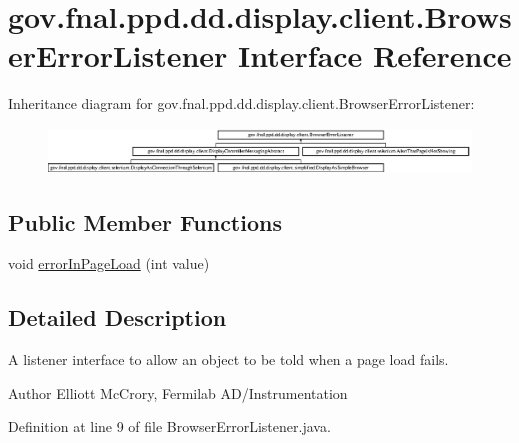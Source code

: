 \hypertarget{interfacegov_1_1fnal_1_1ppd_1_1dd_1_1display_1_1client_1_1BrowserErrorListener}{\section{gov.\-fnal.\-ppd.\-dd.\-display.\-client.\-Browser\-Error\-Listener Interface Reference}
\label{interfacegov_1_1fnal_1_1ppd_1_1dd_1_1display_1_1client_1_1BrowserErrorListener}
}
Inheritance diagram for gov.\-fnal.\-ppd.\-dd.\-display.\-client.\-Browser\-Error\-Listener\-:\begin{figure}[H]
\begin{center}
\leavevmode
\includegraphics[height=1.209503cm]{interfacegov_1_1fnal_1_1ppd_1_1dd_1_1display_1_1client_1_1BrowserErrorListener}
\end{center}
\end{figure}
\subsection*{Public Member Functions}
\begin{DoxyCompactItemize}
\item 
void \hyperlink{interfacegov_1_1fnal_1_1ppd_1_1dd_1_1display_1_1client_1_1BrowserErrorListener_a3e9b377582160013a1ff99cfe29765f3}{error\-In\-Page\-Load} (int value)
\end{DoxyCompactItemize}


\subsection{Detailed Description}
A listener interface to allow an object to be told when a page load fails.

\begin{DoxyAuthor}{Author}
Elliott Mc\-Crory, Fermilab A\-D/\-Instrumentation 
\end{DoxyAuthor}


Definition at line 9 of file Browser\-Error\-Listener.\-java.



